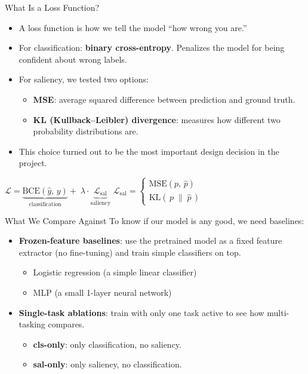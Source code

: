 \documentclass{beamer}
\begin{document}
\begin{frame}{What Is a Loss Function?}
\begin{itemize}
  \item A loss function is how we tell the model ``how wrong you are.''
  \item For classification: \textbf{binary cross-entropy}. Penalizes the model for being confident about wrong labels.
  \item For saliency, we tested two options:
  \begin{itemize}
    \item \textbf{MSE}: average squared difference between prediction and ground truth.
    \item \textbf{KL (Kullback--Leibler) divergence}: measures how different two probability distributions are.
  \end{itemize}
  \item This choice turned out to be the most important design decision in the project.
\end{itemize}
\vfill
\begin{center}
\small
$\mathcal{L} = \underbrace{\text{BCE}(\hat{y},\, y)}_{\text{classification}} + \;\lambda \cdot \underbrace{\mathcal{L}_{\text{sal}}}_{\text{saliency}}$
\qquad
$\mathcal{L}_{\text{sal}} = \begin{cases} \text{MSE}(p,\, \hat{p}) \\ \text{KL}(\,p \;\|\; \hat{p}\,) \end{cases}$
\end{center}
\end{frame}

\begin{frame}{What We Compare Against}
To know if our model is any good, we need baselines:
\vfill
\begin{itemize}
  \item \textbf{Frozen-feature baselines}: use the pretrained model as a fixed feature extractor (no fine-tuning) and train simple classifiers on top.
  \begin{itemize}
    \item Logistic regression (a simple linear classifier)
    \item MLP (a small 1-layer neural network)
  \end{itemize}
  \item \textbf{Single-task ablations}: train with only one task active to see how multi-tasking compares.
  \begin{itemize}
    \item \textbf{cls-only}: only classification, no saliency.
    \item \textbf{sal-only}: only saliency, no classification.
  \end{itemize}
\end{itemize}
\end{frame}
\end{document}
